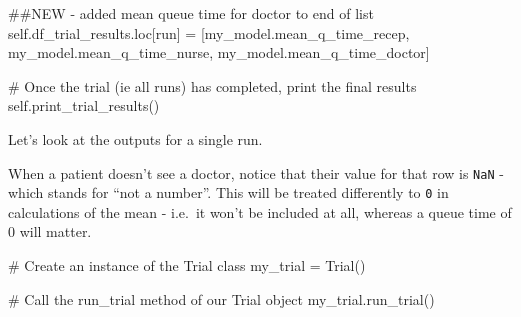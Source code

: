 \documentclass[
  letterpaper,
  DIV=11,
  numbers=noendperiod]{scrreprt}
\newenvironment{Shaded}{\begin{snugshade}}{\end{snugshade}}
\newcommand{\CommentTok}[1]{\textcolor[rgb]{0.37,0.37,0.37}{#1}}
\newcommand{\NormalTok}[1]{\textcolor[rgb]{0.00,0.23,0.31}{#1}}
\newcommand{\OperatorTok}[1]{\textcolor[rgb]{0.37,0.37,0.37}{#1}}
\newcommand{\VariableTok}[1]{\textcolor[rgb]{0.07,0.07,0.07}{#1}}
\begin{document}
\begin{tcolorbox}
\begin{Shaded}
\begin{Highlighting}[]
            \CommentTok{\#\#NEW {-} added mean queue time for doctor to end of list}
            \VariableTok{self}\NormalTok{.df\_trial\_results.loc[run] }\OperatorTok{=}\NormalTok{ [my\_model.mean\_q\_time\_recep,}
\NormalTok{                                              my\_model.mean\_q\_time\_nurse,}
\NormalTok{                                              my\_model.mean\_q\_time\_doctor]}

        \CommentTok{\# Once the trial (ie all runs) has completed, print the final results}
        \VariableTok{self}\NormalTok{.print\_trial\_results()}
\end{Highlighting}
\end{Shaded}

\end{tcolorbox}

Let's look at the outputs for a single run.

When a patient doesn't see a doctor, notice that their value for that
row is \texttt{NaN} - which stands for ``not a number''. This will be
treated differently to \texttt{0} in calculations of the mean - i.e.~it
won't be included at all, whereas a queue time of 0 will matter.

\begin{Shaded}
\begin{Highlighting}[]
\CommentTok{\# Create an instance of the Trial class}
\NormalTok{my\_trial }\OperatorTok{=}\NormalTok{ Trial()}

\CommentTok{\# Call the run\_trial method of our Trial object}
\NormalTok{my\_trial.run\_trial()}
\end{Highlighting}
\end{Shaded}
\end{document}

